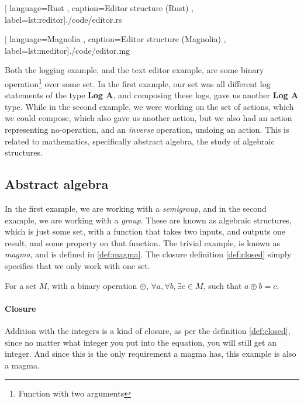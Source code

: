 \begin{code}[H]
  
    [ language=Rust
    , caption={Editor structure (Rust)}
    , label=lst:reditor]{./code/editor.rs}
\end{code}

\begin{code}[H]
  
    [ language=Magnolia
    , caption={Editor structure (Magnolia)}
    , label=lst:meditor]{./code/editor.mg}
\end{code}

Both the logging example, and the text editor example, are some binary operation\footnote{Function with two arguments}
over some set. In the first example, our set was all different log statements of
the type \textbf{Log A}, and composing these logs, gave us another
\textbf{Log A} type. While in the second example, we were working on the set of
actions, which we could compose, which also gave us another action, but we also
had an action representing no-operation, and an \textit{inverse} operation,
undoing an action. This is related to mathematics, specifically abstract
algebra, the study of algebraic structures.

\subsection{Abstract algebra}

In the first example, we are working with a \textit{semigroup}, and in the
second example, we are working with a \textit{group}. These are known as
algebraic structures, which is just some set, with a function that takes two
inputs, and outputs one result, and some property on that function. The trivial
example, is known as \textit{magma}, and is defined in \ref{def:magma}. The
closure definition \ref{def:closed} simply specifies that we only work with one
set.

\begin{definition}[Closure] \label{def:closed}
  For a set $M$, with a binary operation $\oplus$,
  $\forall a, \forall b, \exists c \in M$, such that
  $a \oplus b = c$.
\end{definition}

\paragraph{Closure} Addition with the integers is a kind of closure, as per the
definition \ref{def:closed}, since no matter what integer you put into the
equation, you will still get an integer. And since this is the only requirement a
magma has, this example is also a magma.

